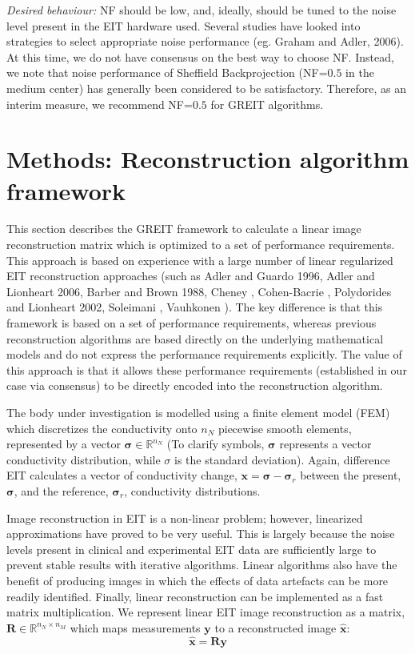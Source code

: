 \documentclass[12pt]{iopart}
\newcommand{\xB}{\mbox{$\mathbf{x}$}}
\newcommand{\xH}{\mbox{$\mathbf{\hat x}$}}
\newcommand{\yB}{\mbox{$\mathbf{y}$}}
\newcommand{\RB}{\mbox{$\mathbf{R}$}}
\newcommand{\sG}{\mbox{${\boldsymbol \sigma}$}}
\begin{document}
\begin{itemize}
\hspace{5mm}
{\em Desired behaviour:}
NF should be low, and, ideally, should be tuned to the noise
level present in the EIT hardware used.
Several studies have looked into strategies to select
appropriate noise performance (eg. Graham and Adler, 2006).
At this time, we do not have consensus on the best
way to choose NF. Instead, we note that noise performance
of Sheffield Backprojection (NF=$0.5$ in the medium center)
has generally been considered to be satisfactory.
Therefore, as an interim measure, we recommend NF=$0.5$
for GREIT algorithms.

\end{itemize}

\section{Methods: Reconstruction algorithm framework}

This section describes the GREIT framework to calculate
a linear image reconstruction matrix which is optimized
to a set of performance requirements. This approach
is based on experience with a large number of 
linear regularized EIT reconstruction approaches
(such as
Adler and Guardo 1996,
Adler and Lionheart 2006,
Barber and Brown 1988,
Cheney ,
Cohen-Bacrie ,
Polydorides and Lionheart 2002,
Soleimani ,
Vauhkonen ).
The key difference is that this framework
is based on a set of performance requirements, whereas
previous reconstruction algorithms are based directly on
the underlying mathematical models and do not express
the performance requirements explicitly.
The value of this approach is that it allows
these performance requirements (established in our case
via consensus) to be directly encoded into the
reconstruction algorithm.

The body under investigation is modelled using a finite element
model (FEM) which discretizes the conductivity onto $n_N$
piecewise smooth elements, represented by a vector
$\sG\in\mathbb{R}^{n_N}$ (To clarify symbols,
$\sG$ represents a vector conductivity distribution, while
$\sigma$ is the standard deviation).
Again, difference EIT calculates a vector of
conductivity change, $\xB = \sG - \sG_r$ between the present,
$\sG$, and the reference, $\sG_r$,
conductivity distributions.

Image reconstruction in EIT is a non-linear problem; however,
linearized approximations have proved to be very useful.
This is largely because the noise levels present in clinical
and experimental EIT data are sufficiently large
to prevent stable results with iterative algorithms.
Linear algorithms also have the benefit of producing
images in which the effects
of data artefacts can be more readily identified. Finally,
linear reconstruction can be implemented as a fast matrix
multiplication. We represent linear EIT image reconstruction
as a matrix, $\RB\in\mathbb{R}^{n_N\times n_M}$ which
maps measurements $\yB$ to a reconstructed image $\xH$:
\begin{equation} 
\label{reconst_eqn}
   \xH = \RB \yB
\end{equation} 
 
\end{document}
